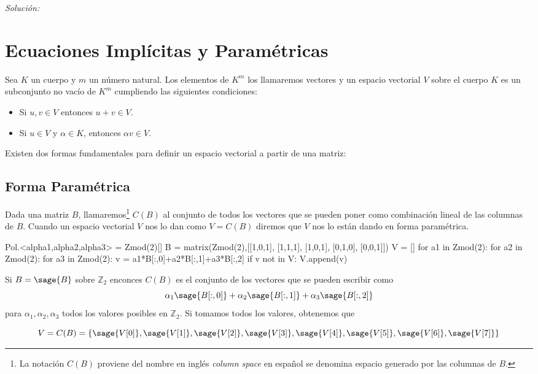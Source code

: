 \documentclass{amsart}
\begin{document}
{\it Solución:}



\section{Ecuaciones Implícitas y Paramétricas}

Sea $K$ un cuerpo y $m$ un número natural. Los elementos de $K^m$ los 
llamaremos vectores y un espacio vectorial $V$ sobre el cuerpo $K$ es un 
subconjunto no vacío de $K^m$ cumpliendo las siguientes condiciones:
\begin{itemize}
\item Si $u,v \in V$ entonces $u+v \in V$.
\item Si $u \in V$ y $\alpha \in K$, entonces $\alpha v \in V$.
\end{itemize}
Existen dos formas fundamentales para definir un espacio vectorial a 
partir de una matriz:

\subsection{Forma Paramétrica} Dada una matriz $B$, llamaremos\footnote{La
notación $C(B)$ proviene del nombre en inglés {\it column space} en español
se denomina espacio generado por las columnas de $B$.} $C(B)$
al conjunto de todos los vectores que se pueden poner como combinación
lineal de las columnas de $B$. Cuando un espacio vectorial $V$ nos lo
dan como $V = C(B)$ diremos que $V$ nos lo están dando en forma paramétrica.

\begin{sagecode}
Pol.<alpha1,alpha2,alpha3>  = Zmod(2)[]
B = matrix(Zmod(2),[[1,0,1],
[1,1,1],
[1,0,1],
[0,1,0],
[0,0,1]])
V = []
for a1 in Zmod(2):
  for a2 in Zmod(2):
    for a3 in Zmod(2):
      v = a1*B[:,0]+a2*B[:,1]+a3*B[:,2]
      if v not in V:
        V.append(v)
\end{sagecode}

Si $B = \sage{B}$ sobre ${\mathbb Z}_2$ enconces
$C(B)$ es el conjunto de los vectores que se pueden escribir como
$$ \alpha_1 \sage{B[:,0]} + \alpha_2 \sage{B[:,1]} + \alpha_3\sage{B[:,2]}$$
para $\alpha_1,\alpha_2,\alpha_3$ todos los valores posibles en 
${\mathbb Z}_2$. Si tomamos todos los valores, obtenemos que 

$$V = C(B) = \left\{ \sage{V[0]},\sage{V[1]},\sage{V[2]},\sage{V[3]},
\sage{V[4]},\sage{V[5]},\sage{V[6]},\sage{V[7]}\right\}$$  
\end{document}
